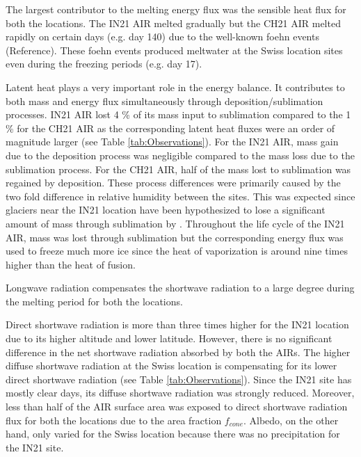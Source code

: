 \documentclass[utf8]{frontiersSCNS} %
\begin{document}
The largest contributor to the melting energy flux was the sensible heat flux for both the locations. The IN21
AIR melted gradually but the CH21 AIR melted rapidly on certain days (e.g.  day 140) due to the well-known foehn
events (Reference). These foehn events produced meltwater at the Swiss location sites even during the freezing periods
(e.g.  day 17).

Latent heat plays a very important role in the energy balance. It contributes to both mass and energy flux
simultaneously through deposition/sublimation processes. IN21 AIR lost 4 \% of its mass input to sublimation
compared to the 1 \% for the CH21 AIR as the corresponding latent heat fluxes were an order of magnitude larger
(see Table \ref{tab:Observations}). For the IN21 AIR, mass gain due to the deposition process was negligible
compared to the mass loss due to the sublimation process. For the CH21 AIR, half of the mass lost to sublimation was regained by deposition.
These process differences were primarily caused by the two fold difference in relative humidity between the sites. This was
expected since glaciers near the IN21 location have been hypothesized to lose a significant amount of mass
through sublimation by \cite{azam_2018}. Throughout the life cycle of the IN21 AIR, mass was lost through
sublimation but the corresponding energy flux was used to freeze much more ice since the heat of vaporization is
around nine times higher than the heat of fusion.

Longwave radiation compensates the shortwave radiation to a large degree during the melting period for both the
locations.

Direct shortwave radiation is more than three times higher for the IN21 location due to its higher altitude and lower latitude. However,
there is no significant difference in the net shortwave radiation absorbed by both the AIRs. The
higher diffuse shortwave radiation at the Swiss location is compensating for its lower direct shortwave radiation (see
Table \ref{tab:Observations}).  Since the IN21 site has mostly clear days, its diffuse shortwave radiation
was strongly reduced. Moreover, less than half of the AIR surface area was exposed to direct shortwave radiation flux for
both the locations due to the area fraction $f_{cone}$.   Albedo, on the other hand, only varied for the Swiss
location because there was no precipitation for the IN21 site.
\end{document}
